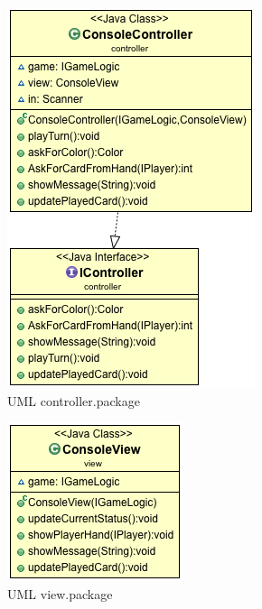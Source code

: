 \documentclass[letterpaper,11pt]{article}
\begin{document}
\begin{figure}[H]
\center
\includegraphics[scale=0.5]{controller.png}
\caption{UML controller.package}
\end{figure}

\begin{figure}[H]
\center
\includegraphics[scale=0.5]{view.png}
\caption{UML view.package}
\end{figure}
\end{document}
